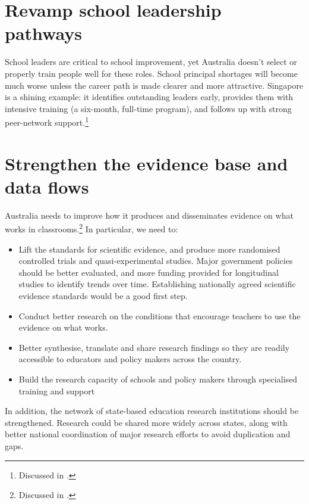 \section{Revamp school leadership pathways}\label{sec:revamp-leadership}

School leaders are critical to school improvement, yet Australia doesn't select or properly train people well for these roles. School principal shortages will become much worse unless the career path is made clearer and more attractive. Singapore is a shining example: it identifies outstanding leaders early,  provides them with intensive training (a six-month, full-time program), and follows up with strong peer-network support.\footnote{Discussed in \textcite{Jensen2012CatchingUpLearning}.}

\section{Strengthen the evidence base and data flows}\label{sec:evidence-base}

Australia needs to improve how it produces and disseminates evidence on what works in classrooms.\footnote{Discussed in \textcite{Goss2016SubmissiontotheProductivityCommissionInquiryintotheNationalEducationEvidenceBase}.}
In particular, we need to:
\begin{itemize}
    \item Lift the standards for scientific evidence, and produce more randomised controlled trials and quasi-experimental studies. Major government policies should be better evaluated, and more funding provided for longitudinal studies to identify trends over time. Establishing nationally agreed scientific evidence standards would be a good first step. 
    \item Conduct better research on the conditions that encourage teachers to use the evidence on what works.
    \item Better synthesise, translate and share research findings so they are readily accessible to educators and policy makers across the country.
    \item Build the research capacity of schools and policy makers through specialised training and support
    
\end{itemize}

In addition, the network of state-based education research institutions should be strengthened. Research could be shared more widely across states, along with better national coordination of major research efforts to avoid duplication and gaps. 

